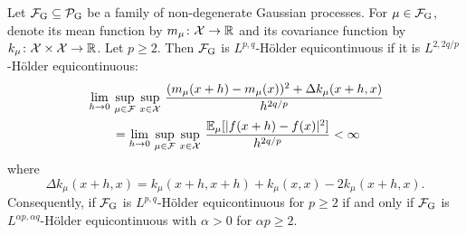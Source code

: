 \documentclass[12pt]{report}
\begin{document}
\begin{proposition} \label{prop:Holder_continuity_Gaussians}
    Let $\F\ss{G} \sub \mathcal{P}\ss{G}$ be a family of non-degenerate Gaussian processes.
    For $\mu \in \F\ss{G}$, denote its mean function by $m_\mu\colon \mathcal{X} \to \mathbb{R}$ and its covariance function by $k_\mu\colon \mathcal{X} \times \mathcal{X} \to \mathbb{R}$.
    Let $p \ge 2$.
    Then $\F\ss{G}$ is $L^{p, q}$-H\"older equicontinuous if  it is $L^{2, 2q/p}$-H\"older equicontinuous:
    \begin{align*}
        &\lim_{h \to 0}\,
        \operatorname*{sup}_{\mu \in \mathcal{F}}\,
        \operatorname*{sup}_{x \in \mathcal{X}}\,
        \frac{(m_\mu(x + h) - m_\mu(x))^2 + \Delta k_\mu(x + h, x)}{h^{2q/p}} \\
        &\qquad =
        \lim_{h \to 0}\,
        \operatorname*{sup}_{\mu \in \mathcal{F}}\,
        \operatorname*{sup}_{x \in \mathcal{X}}\,
        \frac{\mathbb{E}_\mu[\lvert f(x + h) - f(x)\rvert^2]}{h^{2q/p}}
        < \infty
    \end{align*}
    where
    \begin{equation}
        \Delta k_\mu(x + h, x)
        = k_\mu(x + h, x + h) + k_\mu(x, x) - 2 k_\mu(x + h, x).
    \end{equation}
    Consequently, if $\F\ss{G}$ is $L^{p,q}$-H\"older equicontinuous for $p \ge 2$ if and only if $\F\ss{G}$ is $L^{\alpha p,\alpha q}$-H\"older equicontinuous with $\alpha > 0$ for $\alpha p \ge 2$.
\end{proposition}
\end{document}
